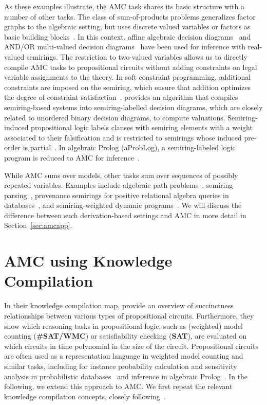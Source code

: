 \documentclass{article}
\theoremstyle{plain}
\theoremstyle{definition}
\begin{document}
As these examples illustrate, 
the AMC task shares its basic structure with a number
of other tasks. 
The class of sum-of-products problems
generalizes factor graphs to the algebraic setting, but uses
discrete valued variables or factors as basic building
blocks~\citep{bacchus2009solving}. In this context, affine algebraic
decision diagrams~\citep{Sanner05} and AND/OR multi-valued decision
diagrams~\citep{Mateescu08} have been used for inference with real-valued semirings. The
restriction to two-valued variables allows us to directly compile AMC
tasks to propositional circuits without adding constraints on legal
variable assignments to the theory. In soft
constraint programming, additional constraints are
imposed on the semiring, which ensure that addition optimizes the
degree of constraint satisfaction~\citep{Meseguer06}. \cite{Wilson05}
provides an algorithm that compiles semiring-based systems into
semiring-labelled decision diagrams, which are closely related to
unordered binary decision diagrams, to compute valuations.  Semiring-induced
propositional logic labels clauses with semiring elements with a
weight associated to their falsification and is restricted to
semirings whose induced pre-order is partial~\citep{Larrosa10}. In algebraic Prolog
(aProbLog), a semiring-labeled logic program is
reduced to  AMC for inference~\citep{Kimmig11}. 

While AMC sums over models, other tasks sum over sequences
of possibly repeated variables. Examples include 
algebraic path
problems~\citep{baras2010path}, semiring
parsing~\citep{Goodman99}, provenance semirings for positive
relational algebra queries in databases~\citep{Green2007}, and
semiring-weighted dynamic programs~\citep{Eisner05}. We will discuss  the difference
between such derivation-based settings and AMC in 
more detail 
in Section~\ref{sec:amcapp}.




\section{AMC using Knowledge Compilation} \label{sec:amc-kc}
In their knowledge compilation map, \citet{darwiche2002knowledge}
provide an overview of succinctness relationships between various
types of propositional circuits. Furthermore, they show which reasoning tasks in
propositional logic, such as (weighted) model
counting (\textbf{\#SAT/WMC}) or satisfiability checking
(\textbf{SAT}), are evaluated on which circuits in time polynomial in
the size of the circuit.  Propositional circuits are often used as a
representation language in  weighted model counting and similar
tasks, including for instance probability calculation and
sensitivity analysis in probabilistic databases~\citep{Jha11,Kanagal11}
and  inference in algebraic
Prolog~\citep{Kimmig11}. In the following, we extend this approach to
AMC. We  first repeat the relevant knowledge compilation
concepts, closely following~\citet{darwiche2002knowledge}.
\end{document}
